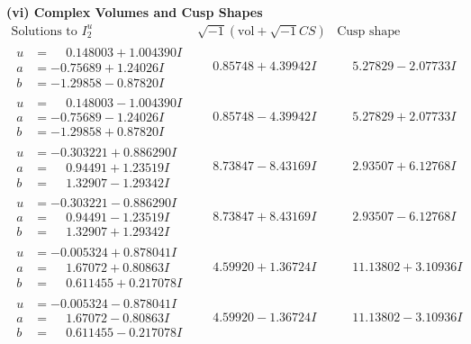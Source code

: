 \documentclass[1p]{elsarticle_modified}
\theoremstyle{definition}
\newcommand{\I}{\sqrt{-1}}
\begin{document}
\newpage\flushleft \textbf{(vi) Complex Volumes and Cusp Shapes}
$$\begin{array}{c|c|c}  
\text{Solutions to }I^u_{2}& \I (\text{vol} + \sqrt{-1}CS) & \text{Cusp shape}\\
 \hline 
\begin{aligned}
u &= \phantom{-}0.148003 + 1.004390 I \\
a &= -0.75689 + 1.24026 I \\
b &= -1.29858 - 0.87820 I\end{aligned}
 & \phantom{-}0.85748 + 4.39942 I & \phantom{-}5.27829 - 2.07733 I \\ \hline\begin{aligned}
u &= \phantom{-}0.148003 - 1.004390 I \\
a &= -0.75689 - 1.24026 I \\
b &= -1.29858 + 0.87820 I\end{aligned}
 & \phantom{-}0.85748 - 4.39942 I & \phantom{-}5.27829 + 2.07733 I \\ \hline\begin{aligned}
u &= -0.303221 + 0.886290 I \\
a &= \phantom{-}0.94491 + 1.23519 I \\
b &= \phantom{-}1.32907 - 1.29342 I\end{aligned}
 & \phantom{-}8.73847 - 8.43169 I & \phantom{-}2.93507 + 6.12768 I \\ \hline\begin{aligned}
u &= -0.303221 - 0.886290 I \\
a &= \phantom{-}0.94491 - 1.23519 I \\
b &= \phantom{-}1.32907 + 1.29342 I\end{aligned}
 & \phantom{-}8.73847 + 8.43169 I & \phantom{-}2.93507 - 6.12768 I \\ \hline\begin{aligned}
u &= -0.005324 + 0.878041 I \\
a &= \phantom{-}1.67072 + 0.80863 I \\
b &= \phantom{-}0.611455 + 0.217078 I\end{aligned}
 & \phantom{-}4.59920 + 1.36724 I & \phantom{-}11.13802 + 3.10936 I \\ \hline\begin{aligned}
u &= -0.005324 - 0.878041 I \\
a &= \phantom{-}1.67072 - 0.80863 I \\
b &= \phantom{-}0.611455 - 0.217078 I\end{aligned}
 & \phantom{-}4.59920 - 1.36724 I & \phantom{-}11.13802 - 3.10936 I \\ \hline\begin{aligned}

\end{aligned}
\end{array}$$
\end{document}

